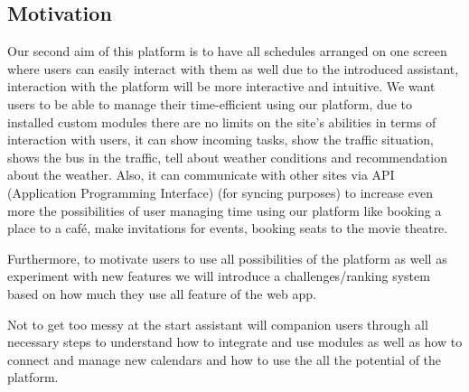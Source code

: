 \subsection{Motivation}
\par Our second aim of this platform is to have all schedules arranged on one screen where users can easily interact with them as well due to the introduced assistant, interaction with the platform will be more interactive and intuitive. We want users to be able to manage their time-efficient using our platform, due to installed custom modules there are no limits on the site's abilities in terms of interaction with users, it can show incoming tasks, show the traffic situation, shows the bus in the traffic, tell about weather conditions and recommendation about the weather. Also, it can communicate with other sites via API (Application Programming Interface) (for syncing purposes) to increase even more the possibilities of user managing time using our platform like booking a place to a café, make invitations for events, booking seats to the movie theatre. 

Furthermore, to motivate users to use all possibilities of the platform as well as experiment with new features we will introduce a challenges/ranking system based on how much they use all feature of the web app. 

Not to get too messy at the start assistant will companion users through all necessary steps to understand how to integrate and use modules as well as how to connect and manage new calendars and how to use the all the potential of the platform. 

\clearpage